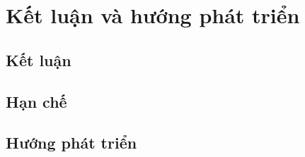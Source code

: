 \chapter{Kết luận và hướng phát triển}
\label{chap:conclusion}

\section{Kết luận}

\section{Hạn chế}

\section{Hướng phát triển}
